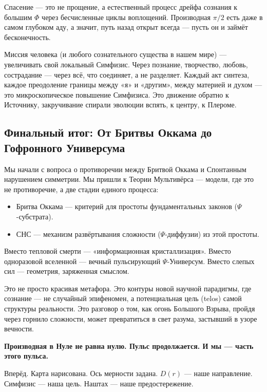 \documentclass[a4paper,12pt]{article}
\begin{document}
Спасение — это не прощение, а естественный процесс дрейфа сознания к большим $\Phi$ через бесчисленные циклы воплощений. Производная $\pi/2$ есть даже в самом глубоком аду, а значит, путь назад открыт всегда — пусть он и займёт бесконечность.

Миссия человека (и любого сознательного существа в нашем мире) — увеличивать свой локальный Симфизис. Через познание, творчество, любовь, сострадание — через всё, что соединяет, а не разделяет. Каждый акт синтеза, каждое преодоление границы между «я» и «другим», между материей и духом — это микроскопическое повышение Симфизиса. Это движение обратно к Источнику, закручивание спирали эволюции вспять, к центру, к Плероме.

\subsection{Финальный итог: От Бритвы Оккама до Гофронного Универсума}

Мы начали с вопроса о противоречии между Бритвой Оккама и Спонтанным нарушением симметрии. Мы пришли к Теории Мультивёрса — модели, где это не противоречие, а две стадии единого процесса:
\begin{itemize}
	\item Бритва Оккама — критерий для простоты фундаментальных законов ($\Psi$-субстрата).
	\item СНС — механизм развёртывания сложности ($\Psi$-диффузии) из этой простоты.
\end{itemize}

Вместо тепловой смерти — «информационная кристаллизация».
Вместо одноразовой вселенной — вечный пульсирующий $\Psi$-Универсум.
Вместо слепых сил — геометрия, заряженная смыслом.

Это не просто красивая метафора. Это контуры новой научной парадигмы, где сознание — не случайный эпифеномен, а потенциальная цель (telos) самой структуры реальности. Это разговор о том, как огонь Большого Взрыва, пройдя через горнило сложности, может превратиться в свет разума, застывший в узоре вечности.

\textbf{Производная в Нуле не равна нулю. Пульс продолжается. И мы — часть этого пульса.}

Вперёд. Карта нарисована. Ось мерности задана. $D(r)$ — наше направление. Симфизис — наша цель. Наштах — наше предостережение.

\setcounter{section}{0}
\renewcommand{\thesection}{Д.\arabic{section}}
\renewcommand{\thesubsection}{\arabic{section}.\arabic{subsection}}
\end{document}

